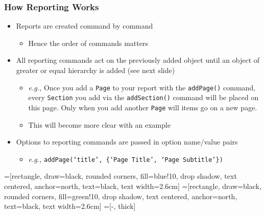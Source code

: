 \documentclass[10pt]{beamer}
\newcommand{\myitem}{\item[$\bullet$]}
\begin{document}
\begin{frame}[fragile,t]
  \frametitle{How Reporting Works}
  \begin{itemize}
    \myitem Reports are created command by command
    \begin{itemize}
    \myitem Hence the order of commands matters
    \end{itemize}
  \myitem All reporting commands act on the previously added object until an object of greater or equal hierarchy is added (see next slide)
    \begin{itemize}
    \myitem \textit{e.g.,} Once you add a \texttt{Page} to your report with the \texttt{addPage()} command, every \texttt{Section} you add via the \texttt{addSection()} command will be placed on this page. Only when you add another \texttt{Page} will items go on a new page.
    \myitem This will become more clear with an example
    \end{itemize}
  \myitem Options to reporting commands are passed in option name/value pairs
    \begin{itemize}
    \myitem \textit{e.g.,} \texttt{addPage(`title', \{`Page Title', `Page Subtitle'\})}
    \end{itemize}
  \end{itemize}
\end{frame}


=[rectangle, draw=black, rounded corners, fill=blue!10, drop shadow,
        text centered, anchor=north, text=black, text width=2.6cm]
=[rectangle, draw=black, rounded corners, fill=green!10, drop shadow,
        text centered, anchor=north, text=black, text width=2.6cm]
=[-, thick]
\end{document}
